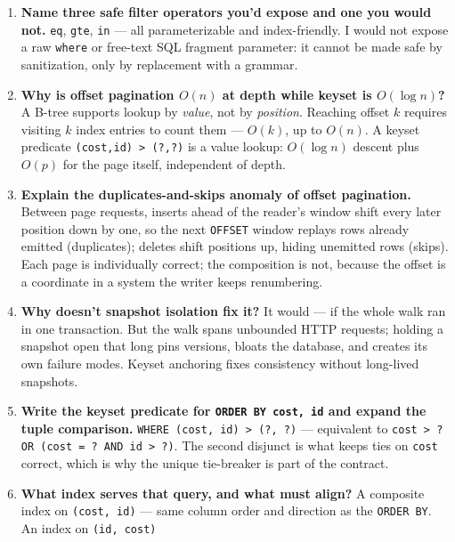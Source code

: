 \begin{enumerate}[label=\textbf{Q\arabic*.}, leftmargin=2.6em]
        the primary key makes the order total, which both offset and keyset
        pagination require to be stable.
  \item \textbf{Name three safe filter operators you'd expose and one you
        would not.}
        \texttt{eq}, \texttt{gte}, \texttt{in} --- all parameterizable and
        index-friendly. I would not expose a raw \texttt{where} or
        free-text SQL fragment parameter: it cannot be made safe by
        sanitization, only by replacement with a grammar.
  \item \textbf{Why is offset pagination $O(n)$ at depth while keyset is
        $O(\log n)$?}
        A B-tree supports lookup by \emph{value}, not by \emph{position}.
        Reaching offset $k$ requires visiting $k$ index entries to count
        them --- $O(k)$, up to $O(n)$. A keyset predicate \texttt{(cost,id)
        > (?,?)} is a value lookup: $O(\log n)$ descent plus $O(p)$ for the
        page itself, independent of depth.
  \item \textbf{Explain the duplicates-and-skips anomaly of offset
        pagination.}
        Between page requests, inserts ahead of the reader's window shift
        every later position down by one, so the next \texttt{OFFSET}
        window replays rows already emitted (duplicates); deletes shift
        positions up, hiding unemitted rows (skips). Each page is
        individually correct; the composition is not, because the offset is
        a coordinate in a system the writer keeps renumbering.
  \item \textbf{Why doesn't snapshot isolation fix it?}
        It would --- if the whole walk ran in one transaction. But the walk
        spans unbounded HTTP requests; holding a snapshot open that long
        pins versions, bloats the database, and creates its own failure
        modes. Keyset anchoring fixes consistency without long-lived
        snapshots.
  \item \textbf{Write the keyset predicate for \texttt{ORDER BY cost, id}
        and expand the tuple comparison.}
        \texttt{WHERE (cost, id) > (?, ?)} --- equivalent to
        \texttt{cost > ? OR (cost = ? AND id > ?)}. The second disjunct is
        what keeps ties on \texttt{cost} correct, which is why the unique
        tie-breaker is part of the contract.
  \item \textbf{What index serves that query, and what must align?}
        A composite index on \texttt{(cost, id)} --- same column order and
        direction as the \texttt{ORDER BY}. An index on \texttt{(id, cost)}

\end{enumerate}
